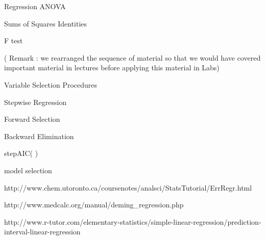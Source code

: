  

Regression ANOVA

Sums of Squares Identities

F test

( Remark : we rearranged the sequence of material so that we would have covered important material in lectures before applying this material in Labs)


Variable Selection Procedures

Stepwise Regression

Forward Selection

Backward Elimination

stepAIC( )

model selection


http://www.chem.utoronto.ca/coursenotes/analsci/StatsTutorial/ErrRegr.html

http://www.medcalc.org/manual/deming_regression.php



http://www.r-tutor.com/elementary-statistics/simple-linear-regression/prediction-interval-linear-regression

